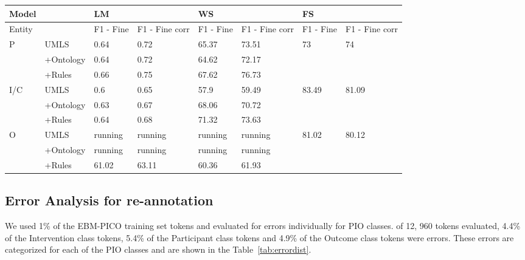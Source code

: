 \documentclass[10.7pt,]{article}
\begin{document}
\begin{table}[!ht]
    \centering
    \begin{tabular}{|l|l|l|l|l|l|l|l|}
    \hline
        Model & ~ & LM & ~ & WS & ~ & FS & ~ \\ \hline
        Entity & ~ & F1 - Fine & F1 - Fine corr & F1 - Fine & F1 - Fine corr & F1 - Fine & F1 - Fine corr \\ \hline
        P & UMLS & 0.64 & 0.72 & 65.37 & 73.51 & 73 & 74 \\ \hline
        ~ & +Ontology & 0.64 & 0.72 & 64.62 & 72.17 & ~ & ~ \\ \hline
        ~ & +Rules & 0.66 & 0.75 & 67.62 & 76.73 & ~ & ~ \\ \hline
        I/C & UMLS & 0.6 & 0.65 & 57.9 & 59.49 & 83.49 & 81.09 \\ \hline
        ~ & +Ontology & 0.63 & 0.67 & 68.06 & 70.72 & ~ & ~ \\ \hline
        ~ & +Rules & 0.64 & 0.68 & 71.32 & 73.63 & ~ & ~ \\ \hline
        O & UMLS & running & running & running & running & 81.02 & 80.12 \\ \hline
        ~ & +Ontology & running & running & running & running & ~ & ~ \\ \hline
        ~ & +Rules & 61.02 & 63.11 & 60.36 & 61.93 & ~ & ~ \\ \hline
    \end{tabular}
\end{table}

%
%
%
\subsection{Error Analysis for re-annotation}\label{subsec:err}
%
We used 1\% of the EBM-PICO training set tokens and evaluated for errors individually for PIO classes.
of 12, 960 tokens evaluated, 4.4\% of the Intervention class tokens, 5.4\% of the Participant class tokens and 4.9\% of the Outcome class tokens were errors.
These errors are categorized for each of the PIO classes and are shown in the Table~\ref{tab:errordist}.
%
\end{document}
